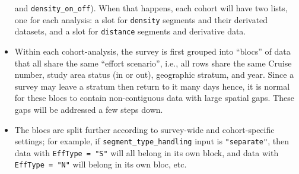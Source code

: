 \documentclass[
]{book}
\begin{document}
\begin{itemize}
 and \texttt{density\_on\_off}). When that happens, each cohort will have two lists, one for each analysis: a slot for \texttt{density} segments and their derivated datasets, and a slot for \texttt{distance} segments and derivative data.
\item
  Within each cohort-analysis, the survey is first grouped into ``blocs'' of data that all share the same ``effort scenario'', i.e., all rows share the same Cruise number, study area status (in or out), geographic stratum, and year. Since a survey may leave a stratum then return to it many days hence, it is normal for these blocs to contain non-contiguous data with large spatial gaps. These gaps will be addressed a few steps down.
\item
  The blocs are split further according to survey-wide and cohort-specific settings; for example, if \texttt{segment\_type\_handling} input is \texttt{"separate"}, then data with \texttt{EffType\ =\ "S"} will all belong in its own block, and data with \texttt{EffType\ =\ "N"} will belong in its own bloc, etc.

\end{itemize}
\end{document}
